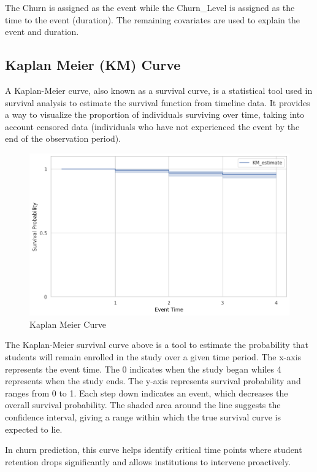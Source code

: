\documentclass[doublespacing]{report} %
\begin{document}
The Churn is assigned as the event while the Churn_Level is assigned as the time to the event (duration). The remaining covariates are used to explain the event and duration.


\subsection{Kaplan Meier (KM) Curve}

A Kaplan-Meier curve, also known as a survival curve, is a statistical tool used in survival analysis to estimate the survival function from timeline data. It provides a way to visualize the proportion of individuals surviving over time, taking into account censored data (individuals who have not experienced the event by the end of the observation period).
\begin{figure}[H]
    \centering
    \includegraphics[width=1\linewidth]{Figure 4/4.1.png}
    \caption{Kaplan Meier Curve}
\end{figure}

The Kaplan-Meier survival curve above is a tool to estimate the probability that students will remain enrolled in the study over a given time period. The x-axis represents the event time. The 0 indicates when the study began whiles 4 represents when the study ends. The y-axis represents survival probability and ranges from 0 to 1. Each step down indicates an event, which decreases the overall survival probability.  The shaded area around the line suggests the confidence interval, giving a range within which the true survival curve is expected to lie.

In churn prediction, this curve helps identify critical time points where student retention drops significantly and allows institutions to intervene proactively. 
\end{document}
